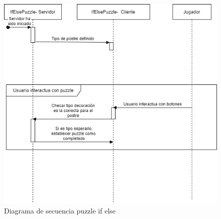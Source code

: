         \begin{figure}[H]
        \centering
        \includegraphics[width=0.8\linewidth]{images/DiagramaSecuenciaPuzzleIfElse.png}
        \caption{Diagrama de secuencia puzzle if else}
        \label{fig:diagrama_sec_if_else}
    \end{figure}
